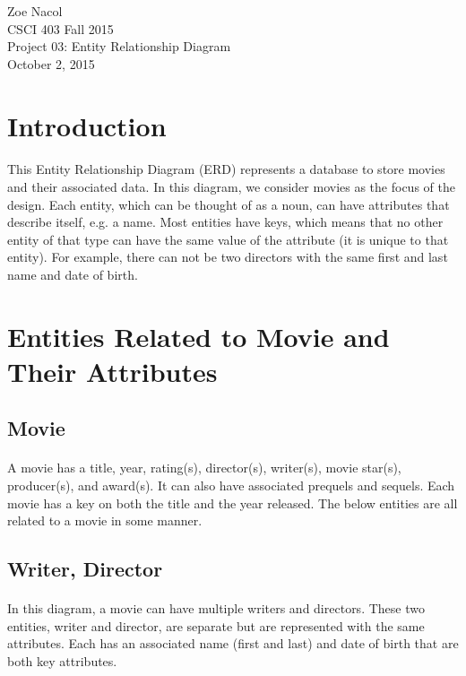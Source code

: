 \documentclass[12pt]{article}
\begin{document}
\begin{flushleft}
Zoe Nacol \\
CSCI 403 Fall 2015 \\
Project 03: Entity Relationship Diagram \\
October 2, 2015 \\
\end{flushleft}
\section{Introduction}
\paragraph{}This Entity Relationship Diagram (ERD) represents a database to store movies and their associated data. In this diagram, we consider movies as the focus of the design. Each entity, which can be thought of as a noun, can have attributes that describe itself, e.g. a name. Most entities have keys, which means that no other entity of that type can have the same value of the attribute (it is unique to that entity). For example, there can not be two directors with the same first and last name and date of birth.
\section{Entities Related to Movie and Their Attributes}
\subsection{Movie}
\paragraph{}A movie has a title, year, rating(s), director(s), writer(s), movie star(s), producer(s), and award(s). It can also have associated prequels and sequels. Each movie has a key on both the title and the year released. The below entities are all related to a movie in some manner.
\subsection{Writer, Director}
\paragraph{}In this diagram, a movie can have multiple writers and directors. These two entities, writer and director, are separate but are represented with the same attributes. Each has an associated name (first and last) and date of birth that are both key attributes.
\end{document}
